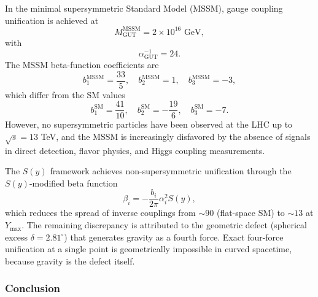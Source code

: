 \documentclass[a4paper,1pt,oneside,openany]{book}
\begin{document}
In the minimal supersymmetric Standard Model (MSSM), gauge coupling unification is achieved at
\begin{equation}
M_{\mathrm{GUT}}^{\mathrm{MSSM}} = 2 \times 10^{16} \text{ GeV},
\label{eq:MGUT-MSSM}
\end{equation}
with
\begin{equation}
\alpha_{\mathrm{GUT}}^{-1} = 24.
\label{eq:alphaGUT-MSSM}
\end{equation}
The MSSM beta-function coefficients are
\begin{equation}
b_1^{\mathrm{MSSM}} = \frac{33}{5}, \quad b_2^{\mathrm{MSSM}} = 1, \quad b_3^{\mathrm{MSSM}} = -3,
\label{eq:b-MSSM}
\end{equation}
which differ from the SM values
\begin{equation}
b_1^{\mathrm{SM}} = \frac{41}{10}, \quad b_2^{\mathrm{SM}} = -\frac{19}{6}, \quad b_3^{\mathrm{SM}} = -7.
\label{eq:b-SM}
\end{equation}
However, no supersymmetric particles have been observed at the LHC up to $\sqrt{s} = 13$ TeV, and the MSSM is increasingly disfavored by the absence of signals in direct detection, flavor physics, and Higgs coupling measurements.

The $S(y)$ framework achieves non-supersymmetric unification through the $S(y)$-modified beta function
\begin{equation}
\beta_i = -\frac{b_i}{2\pi}\alpha_i^2 S(y),
\label{eq:beta-S}
\end{equation}
which reduces the spread of inverse couplings from $\sim 90$ (flat-space SM) to $\sim 13$ at $Y_{\max}$. The remaining discrepancy is attributed to the geometric defect (spherical excess $\delta = 2.81^\circ$) that generates gravity as a fourth force. Exact four-force unification at a single point is geometrically impossible in curved spacetime, because gravity is the defect itself.

\subsubsection{Conclusion}
\end{document}

